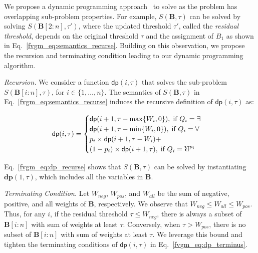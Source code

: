 We propose a dynamic programming approach~\cite{pisinger1999linear,woeginger1992equal} to solve {\stochastic} as the problem has overlapping sub-problem properties. 
For example, $S(\mathbf{B}, \tau)$ can be solved by solving $S(\mathbf{B}[2:n], \tau')$, where the updated threshold $\tau'$, called the \textit{residual threshold}, depends on the original threshold $\tau$ and the assignment of $B_1$ as shown in Eq.~\eqref{fvgm_eq:semantics_recurse}.
Building on this observation, we propose the recursion and terminating condition leading to our dynamic programming algorithm. 

\textit{Recursion.} We consider a function $ \mathsf{dp}(i, \tau) $ that solves the sub-problem $ S(\mathbf{B}[i:n],\tau)  $, for $ i \in \{1,\ldots,n\}  $. The semantics of  $ S(\mathbf{B},\tau) $ in Eq.~\eqref{fvgm_eq:semantics_recurse} induces the recursive definition of $ \mathsf{dp}(i,\tau) $ as: 

\begin{align}\label{fvgm_eq:dp_recurse}
 \mathsf{dp}(i,\tau)=
 \begin{cases}
 \mathsf{dp}(i+1, \tau-\max\{W_i, 0\}), \; \text{if } Q_i = \exists\\
 \mathsf{dp}(i+1, \tau-\min\{W_i, 0\}), \; \text{if } Q_i = \forall\\
 p_i \times \mathsf{dp}(i+1, \tau-W_i) + \\ (1- p_i) \times \mathsf{dp}(i+1, \tau) ,\; \text{if } Q_i = \R^{p_i}
 \end{cases}
\end{align} 

Eq.~\eqref{fvgm_eq:dp_recurse} shows that $ S(\mathbf{B},\tau) $ can be solved by instantiating $ \mathbf{dp}(1, \tau) $, which includes all the variables in $ \mathbf{B} $. 

\textit{Terminating Condition.} %
Let $ W_{neg} $, $ W_{pos} $, and $ W_{all} $ be the sum of negative, positive, and all weights of $ \mathbf{B} $, respectively. We observe that $ W_{neg} \le W_{all} \le W_{pos}$. Thus, for any $ i $, if the {residual} threshold $ \tau \le W_{neg}$, there is always a subset of $ \mathbf{B}[i:n] $ with sum of weights at least $ \tau $. Conversely, when $ \tau > W_{pos}$, there is no subset of $ \mathbf{B}[i:n] $ with sum of weights at least $ \tau $.	We leverage this bound and tighten the terminating conditions of $ \mathsf{dp}(i, \tau) $ in Eq.~\eqref{fvgm_eq:dp_terminus}. 

